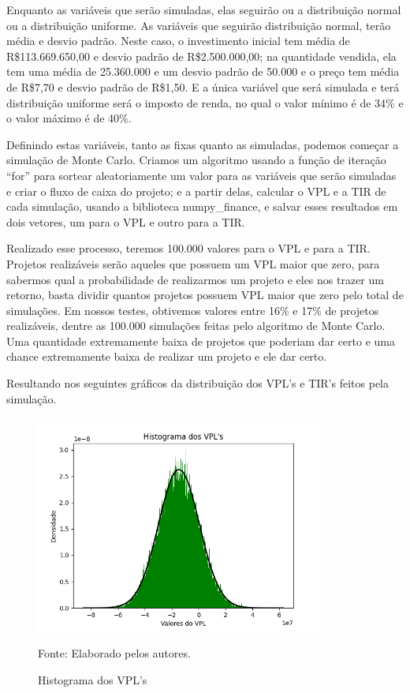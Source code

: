 \documentclass[a4paper,12pt]{article}[abntex2]
\begin{document}
Enquanto as variáveis que serão simuladas, elas seguirão ou a distribuição normal ou a distribuição uniforme. As variáveis que seguirão distribuição normal, terão média e desvio padrão. Neste caso, o investimento inicial tem média de R\$113.669.650,00 e desvio padrão de R\$2.500.000,00; na quantidade vendida, ela tem uma média de 25.360.000 e um desvio padrão de 50.000 e o preço tem média de R\$7,70 e desvio padrão de R\$1,50. E a única variável que será simulada e terá distribuição uniforme será o imposto de renda, no qual o valor mínimo é de 34\% e o valor máximo é de 40\%.

Definindo estas variáveis, tanto as fixas quanto as simuladas, podemos começar a simulação de Monte Carlo. Criamos um algoritmo usando a função de iteração “for” para sortear aleatoriamente um valor para as variáveis que serão simuladas e criar o fluxo de caixa do projeto; e a partir delas, calcular o VPL e a TIR de cada simulação, usando a biblioteca numpy\_finance, e salvar esses resultados em dois vetores, um para o VPL e outro para a TIR.

Realizado esse processo, teremos 100.000 valores para o VPL e para a TIR. Projetos realizáveis serão aqueles que possuem um VPL maior que zero, para sabermos qual a probabilidade de realizarmos um projeto e eles nos trazer um retorno, basta dividir quantos projetos possuem VPL maior que zero pelo total de simulações. Em nossos testes, obtivemos valores entre 16\% e 17\% de projetos realizáveis, dentre as 100.000 simulações feitas pelo algoritmo de Monte Carlo. Uma quantidade extremamente baixa de projetos que poderiam dar certo e uma chance extremamente baixa de realizar um projeto e ele dar certo.

Resultando nos seguintes gráficos da distribuição dos VPL’s e TIR’s feitos pela simulação.

\begin{figure}[H]
\centering
\caption{Histograma dos VPL's}
\includegraphics[width=0.85\textwidth]{Histograma dos VPL's.png}
\label{fig:my_label}

\footnotesize{Fonte: Elaborado pelos autores.}
\end{figure}
\end{document}

